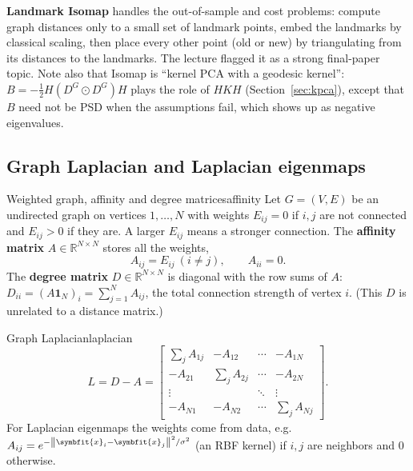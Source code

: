 \documentclass[11pt]{article}
\newcommand{\bm}[1]{\symbfit{#1}}
\newcommand{\R}{\mathbb{R}}
\newcommand{\vx}{\bm{x}}
\newcommand{\one}{\symbf{1}}
\newcommand{\norm}[1]{\left\lVert #1\right\rVert}
\newcommand{\had}{\odot}
\begin{document}
\begin{deeper}
\textbf{Landmark Isomap} handles the out-of-sample and cost problems: compute graph distances only to a small set of
landmark points, embed the landmarks by classical scaling, then place every other point (old or new) by
triangulating from its distances to the landmarks. The lecture flagged it as a strong final-paper topic. Note also
that Isomap is ``kernel PCA with a geodesic kernel'': $B=-\tfrac12H(D^G\had D^G)H$ plays the role of $HKH$ (Section~\ref{sec:kpca}),
except that $B$ need not be PSD when the assumptions fail, which shows up as negative eigenvalues.
\end{deeper}

\subsection{Graph Laplacian and Laplacian eigenmaps}\label{sec:laplacian}

\begin{definition}{Weighted graph, affinity and degree matrices}{affinity}
Let $G=(V,E)$ be an undirected graph on vertices $1,\dots,N$ with weights $E_{ij}=0$ if $i,j$ are not connected and $E_{ij}>0$ if
they are. A larger $E_{ij}$ means a stronger connection. The \textbf{affinity matrix} $A\in\R^{N\times N}$ stores all the weights,
\[
A_{ij}=E_{ij}\ (i\ne j),\qquad A_{ii}=0 .
\]
The \textbf{degree matrix} $D\in\R^{N\times N}$ is diagonal with the row sums of $A$: $D_{ii}=(A\one_N)_i=\sum_{j=1}^NA_{ij}$, the total connection strength of vertex $i$.
(This $D$ is unrelated to a distance matrix.)
\end{definition}

\begin{definition}{Graph Laplacian}{laplacian}
\[
L=D-A=\begin{bmatrix}\sum_jA_{1j}&-A_{12}&\cdots&-A_{1N}\\-A_{21}&\sum_jA_{2j}&\cdots&-A_{2N}\\\vdots&&\ddots&\vdots\\-A_{N1}&-A_{N2}&\cdots&\sum_jA_{Nj}\end{bmatrix}.
\]
For Laplacian eigenmaps the weights come from data, e.g.\ $A_{ij}=e^{-\norm{\vx_i-\vx_j}^2/\sigma^2}$ (an RBF kernel) if $i,j$ are neighbors and $0$ otherwise.
\end{definition}
\end{document}
